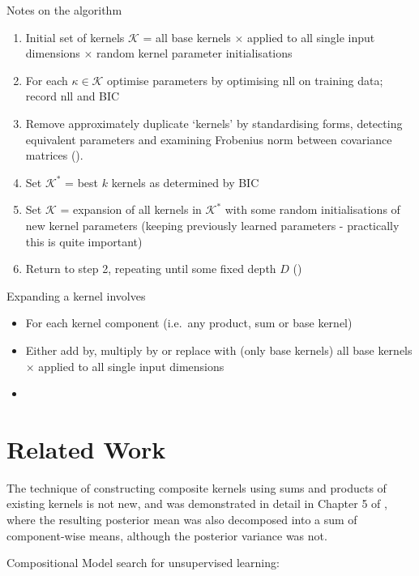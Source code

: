 \documentclass[twoside]{article}
\begin{document}
Notes on the algorithm
\begin{enumerate}
\item Initial set of kernels $\mathcal{K}$ = all base kernels $\times$ applied to all single input dimensions $\times$ random kernel parameter initialisations
\item For each $\kappa \in \mathcal{K}$ optimise parameters by optimising nll on training data; record nll and BIC
\item Remove approximately duplicate `kernels' by standardising forms, detecting equivalent parameters and examining Frobenius norm between covariance matrices ().
\item Set $\mathcal{K}^*$ = best $k$ kernels as determined by BIC
\item Set $\mathcal{K}$ = expansion of all kernels in $\mathcal{K}^*$ with some random initialisations of new kernel parameters (keeping previously learned parameters - practically this is quite important)
\item Return to step 2, repeating until some fixed depth $D$ ()
\end{enumerate}

Expanding a kernel involves
\begin{itemize}
\item For each kernel component (i.e.~any product, sum or base kernel)
\item Either add by, multiply by or replace with (only base kernels) all base kernels $\times$ applied to all single input dimensions
\item {}
\end{itemize}

\section{Related Work}

The technique of constructing composite kernels using sums and products of existing kernels is not new, and was demonstrated in detail in Chapter 5 of \cite{rasmussen38gaussian}, where the resulting posterior mean was also decomposed into a sum of component-wise means, although the posterior variance was not.

Compositional Model search for unsupervised learning: \cite{grosse2012exploiting}
\end{document}
